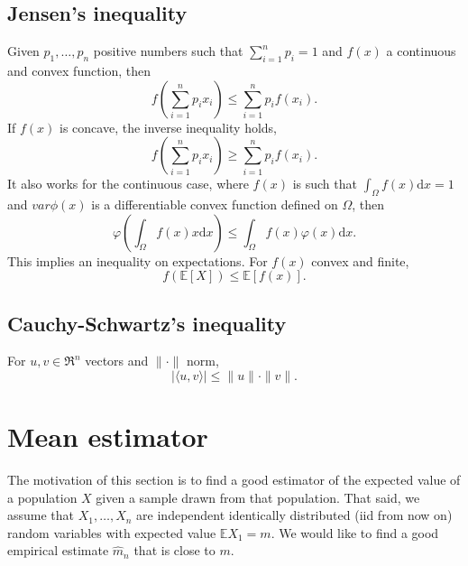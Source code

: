 \documentclass[11pt, english]{article}
\newcommand{\su}[2]{\sum\limits_{#1}^{#2}}
\begin{document}
\subsection*{Jensen's inequality}

Given $p_1,\dots,p_n$ positive numbers such that $\su{i=1}{n}p_i=1$ and $f(x)$ a continuous and convex function, then
\begin{equation}
	f(\su{i=1}{n}p_ix_i)\leq \su{i=1}{n}p_if(x_i).
\end{equation}
If $f(x)$ is concave, the inverse inequality holds,
\begin{equation}
f(\su{i=1}{n}p_ix_i)\geq \su{i=1}{n}p_if(x_i).
\end{equation}
It also works for the continuous case, where $f(x)$ is such that $\int_{\Omega}f(x)\text{d}x=1$ and $var\phi(x)$ is a differentiable convex function defined on $\Omega$, then
\begin{equation}
	\varphi(\int_{\Omega}f(x)x\text{d}x)\leq \int_{\Omega} f(x)\varphi(x)\text{d}x.
\end{equation}
This implies an inequality on expectations. For $f(x)$ convex and finite,
\begin{equation}
	f(\mathbb{E}[X])\leq \mathbb{E}[f(x)].
\end{equation}


\subsection*{Cauchy-Schwartz's inequality}

For $u,v\in \Re^n$ vectors and $\|\cdot\|$ norm,
\begin{equation}
	|\langle u,v\rangle|\leq\|u\|\cdot\|v\|.
\end{equation}

\section{Mean estimator}


The motivation of this section is to find a good estimator of the expected value of a population $X$ given a sample drawn from that population. That said, we assume that $X_1,\dots,X_n$ are independent identically distributed (iid from now on) random variables with expected value $\mathbb{E}X_1=m$. We would like to find a good empirical estimate $\hat{m}_n$ that is close to $m$. \\
\end{document}

